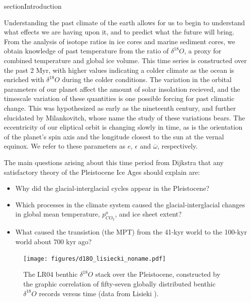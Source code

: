 section{Introduction}

Understanding the past climate of the earth allows for us to begin to understand what effects we are having upon it, and to predict what the future will bring.
From the analysis of isotope ratios in ice cores and marine sediment cores, we obtain knowledge of past temperature from the ratio of $\delta ^{18} O$, a proxy for combined temperature and global ice volume.
This time series is constructed over the past 2 Myr, with higher values indicating a colder climate as the ocean is enriched with $\delta ^{18} O$ during the colder conditions.
The variation in the orbital parameters of our planet affect the amount of solar insolation recieved, and the timescale variation of these quantities is one possible forcing for past climatic change.
This was hypothesized as early as the nineteenth century, and further elucidated by Milankovitch, whose name the study of these variations bears.
The eccentricity of our eliptical orbit is changing slowly in time, as is the orientation of the planet's spin axis and the longitude closest to the sun at the vernal equinox.
We refer to these parameters as $e$, $\epsilon$ and $\overline{\omega}$, respectively.

The main questions arising about this time period from Dijkstra \cite{dijkstra2013} that any satisfactory theory of the Pleistocene Ice Ages should explain are:
\begin{itemize}
\item Why did the glacial-interglacial cycles appear in the Pleistocene?
\item Which processes in the climate system caused the glacial-interglacial changes in global mean temperature, $p^a_{CO_2}$, and ice sheet extent?
\item What caused the transistion (the MPT) from the 41-kyr world to the 100-kyr world about 700 kyr ago?
\end{itemize}

\begin{figure}[tpb!]
\centering
  \texttt{[image: figures/d18O\_lisiecki\_noname.pdf]}
  \caption{
    The LR04 benthic $\delta ^{18} O$ stack over the Pleistocene, constructed by the graphic correlation of fifty-seven globally distributed benthic $\delta ^{18} O$ records versus time (data from Lisieki \cite{lisiecki2005pliocene}).
  }
  \label{fig:insol-data}
\end{figure}

